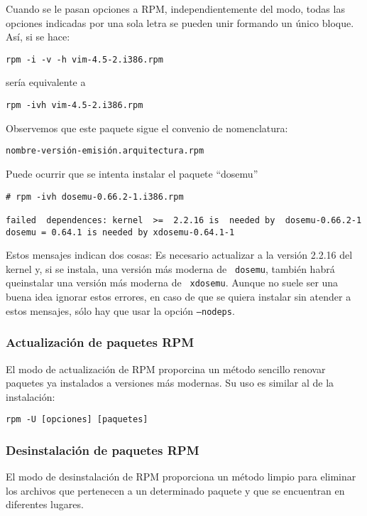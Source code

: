 Cuando se le pasan opciones  a RPM, independientemente del modo, todas
las opciones indicadas  por una sola letra se pueden  unir formando un
único bloque. Así, si se hace:

\begin{verbatim}
rpm -i -v -h vim-4.5-2.i386.rpm
\end{verbatim}

\noindent sería equivalente a

\begin{verbatim}
rpm -ivh vim-4.5-2.i386.rpm
\end{verbatim}

Observemos que este paquete sigue el convenio de nomenclatura:

\begin{verbatim}
nombre-versión-emisión.arquitectura.rpm
\end{verbatim}

Puede ocurrir que se intenta instalar el paquete ``dosemu''

\begin{verbatim}
# rpm -ivh dosemu-0.66.2-1.i386.rpm

failed  dependences: kernel  >=  2.2.16 is  needed by  dosemu-0.66.2-1
dosemu = 0.64.1 is needed by xdosemu-0.64.1-1 
\end{verbatim}

Estos mensajes indican dos cosas: Es necesario actualizar a la versión
2.2.16 del  kernel y, si se  instala, una versión más  moderna de {\tt
dosemu}, también  habrá queinstalar  una versión  más moderna  de {\tt
xdosemu}. Aunque no suele ser una buena idea ignorar estos errores, en
caso de que se quiera instalar  sin atender a estos mensajes, sólo hay
que usar la opción {\tt --nodeps}.

\subsubsection{Actualización de paquetes RPM}
El modo de actualización de  RPM proporcina un método sencillo renovar
paquetes ya instalados a versiones más  modernas. Su uso es similar al
de la instalación:

\begin{verbatim}
rpm -U [opciones] [paquetes]
\end{verbatim}

\subsubsection{Desinstalación de paquetes RPM}
El modo  de desinstalación  de RPM proporciona  un método  limpio para
eliminar los archivos que pertenecen a un determinado paquete y que se
encuentran en diferentes lugares.

